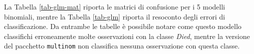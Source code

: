 La Tabella \ref{tab-glm-mat} riporta le matrici di confusione per i 5 modelli binomiali, mentre la Tabella \ref{tab-glm} riporta il resoconto degli errori di classificazione. Da entrambe le tabelle è possibile notare come questo modello classifichi erroneamente molte osservazioni con la classe \textit{Died}, mentre la versione del pacchetto \texttt{multinom} non classifica nessuna osservazione con questa classe.

\begin{table}[htbp]
	\centering
	\hspace{1cm}
\end{table}
